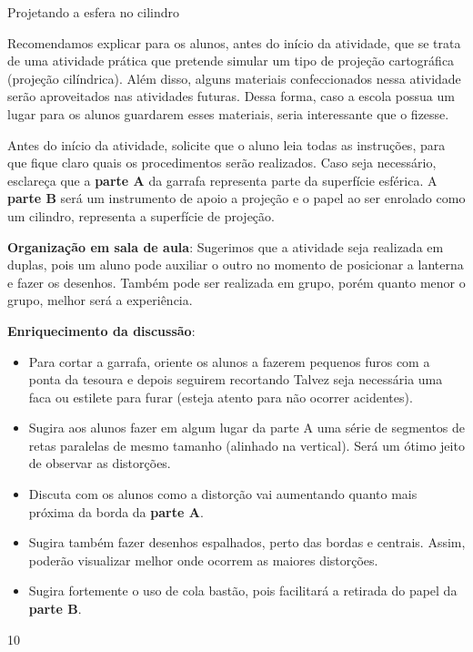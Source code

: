 \begin{sugestions}{Projetando a esfera no cilindro}
{
  Recomendamos explicar para os alunos, antes do início da atividade, que se trata de uma atividade prática que pretende simular um tipo de projeção cartográfica (projeção cilíndrica). Além disso, alguns materiais confeccionados nessa atividade serão aproveitados nas atividades futuras. Dessa forma, caso a escola possua um lugar para os alunos guardarem esses materiais, seria interessante que o fizesse.
  
   Antes do início da atividade, solicite que o aluno leia todas as instruções, para que fique claro quais os procedimentos serão realizados. Caso seja necessário, esclareça que a \textbf{parte A} da garrafa representa parte da superfície esférica. A \textbf{parte B }será um instrumento de apoio a projeção e o papel ao ser enrolado como um cilindro, representa a superfície de projeção.

  \textbf{Organização em sala de aula}: Sugerimos que a atividade seja realizada em duplas, pois um aluno pode auxiliar o outro no momento de posicionar a lanterna e fazer os desenhos. Também pode ser realizada em grupo, porém quanto menor o grupo, melhor será a experiência.

  \textbf{Enriquecimento da discussão}:
\begin{itemize}
\item  Para cortar a garrafa, oriente os alunos a fazerem pequenos furos com a ponta da tesoura e depois seguirem recortando Talvez seja necessária uma faca ou estilete para furar (esteja atento para não ocorrer acidentes).

\item Sugira aos alunos fazer em algum lugar da parte A uma série de segmentos de retas paralelas de mesmo tamanho (alinhado na vertical). Será um ótimo jeito de observar as distorções.

\item Discuta com os alunos como a distorção vai aumentando quanto mais próxima da borda da\textbf{ parte A}.

 \item Sugira também fazer desenhos espalhados, perto das bordas e centrais. Assim, poderão visualizar melhor onde ocorrem as maiores distorções.

\item Sugira fortemente o uso de cola bastão, pois facilitará a retirada do papel da \textbf{parte B}.
\end{itemize}
 
}{1}{0}
\end{sugestions}
